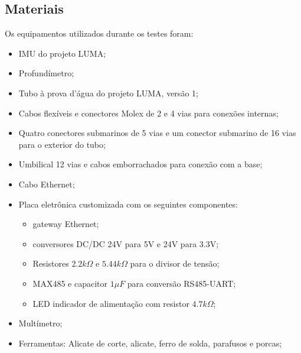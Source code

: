 



\subsection{Materiais}
Os equipamentos utilizados durante os testes foram:
\begin{itemize}
  \item IMU do projeto LUMA;
  \item Profundímetro;
  \item Tubo à prova d'água do projeto LUMA, versão 1;
  \item Cabos flexíveis e conectores Molex de 2 e 4 vias para conexões internas;
  \item Quatro conectores submarinos de 5 vias e um conector submarino de 16
  vias para o exterior do tubo;
  \item Umbilical 12 vias e cabos emborrachados para conexão com a base;
  \item Cabo Ethernet;
  \item Placa eletrônica customizada com os seguintes componentes: 
  \begin{itemize}
    \item gateway Ethernet;
    \item conversores DC/DC 24V para 5V e 24V para 3.3V;
    \item Resistores $2.2k\Omega$ e $5.44k\Omega$ para o divisor de tensão;
    \item MAX485 e capacitor $1\mu F$ para conversão RS485-UART;
    \item LED indicador de alimentação com resistor $4.7k\Omega$;
  \end{itemize}
  \item Multímetro;
  \item Ferramentas: Alicate de corte, alicate, ferro de solda, parafusos e
  porcas;
\end{itemize}
\label{materials}





